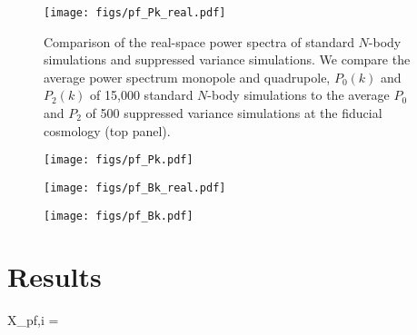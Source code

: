 \begin{figure}
\begin{center}
    \texttt{[image: figs/pf\_Pk\_real.pdf]} 
    \caption{Comparison of the real-space power spectra of standard $N$-body 
    simulations and suppressed variance simulations. We compare the average 
    power spectrum monopole and quadrupole, $P_0(k)$ and $P_2(k)$ of 15,000 
    standard $N$-body simulations to the average $P_0$ and $P_2$ of 500 
    suppressed variance simulations at the fiducial cosmology (top panel).
    }
\label{fig:pk_real}
\end{center}
\end{figure}

\begin{figure}
\begin{center}
    \texttt{[image: figs/pf\_Pk.pdf]} 
    \caption{}
\label{fig:pk_rsd}
\end{center}
\end{figure}

\begin{figure}
\begin{center}
    \texttt{[image: figs/pf\_Bk\_real.pdf]} 
    \caption{}
\label{fig:bk_real}
\end{center}
\end{figure}

\begin{figure}
\begin{center}
    \texttt{[image: figs/pf\_Bk.pdf]} 
    \caption{}
\label{fig:bk_real}
\end{center}
\end{figure}

\section{Results} \label{sec:results} 
\beq
X_{{\rm pf},i} =  \big[ X_{{\rm pf},i}^{(1)} + X_{{\rm pf},i}^{(2)}\big]
\eeq
